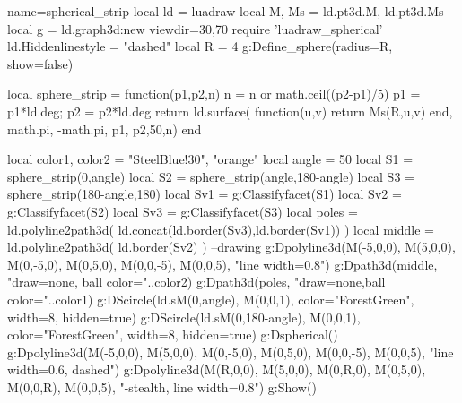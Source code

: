 \documentclass[border=5pt]{standalone}%
\begin{document}
\begin{luadraw}{name=spherical_strip}
local ld = luadraw
local M, Ms = ld.pt3d.M, ld.pt3d.Ms
local g = ld.graph3d:new{ viewdir={30,70} }
require 'luadraw_spherical'
ld.Hiddenlinestyle = "dashed"
local R = 4
g:Define_sphere({radius=R, show=false})

local sphere_strip = function(p1,p2,n)
    n = n or math.ceil((p2-p1)/5)
    p1 = p1*ld.deg; p2 = p2*ld.deg
    return ld.surface( function(u,v) return Ms(R,u,v) end, math.pi, -math.pi, p1, p2,{50,n})
end

local color1, color2 = "SteelBlue!30", "orange"
local angle = 50
local S1 = sphere_strip(0,angle)
local S2 = sphere_strip(angle,180-angle)
local S3 = sphere_strip(180-angle,180)
local Sv1 = g:Classifyfacet(S1)
local Sv2 = g:Classifyfacet(S2)
local Sv3 = g:Classifyfacet(S3)
local poles = ld.polyline2path3d( ld.concat(ld.border(Sv3),ld.border(Sv1)) )
local middle = ld.polyline2path3d( ld.border(Sv2) )
--drawing
g:Dpolyline3d({{M(-5,0,0), M(5,0,0)}, {M(0,-5,0), M(0,5,0)}, {M(0,0,-5), M(0,0,5)}}, 
    "line width=0.8")
g:Dpath3d(middle, "draw=none, ball color="..color2)
g:Dpath3d(poles, "draw=none,ball color="..color1)
g:DScircle({ld.sM(0,angle), M(0,0,1)}, {color="ForestGreen", width=8, hidden=true})
g:DScircle({ld.sM(0,180-angle), M(0,0,1)}, {color="ForestGreen", width=8, hidden=true})
g:Dspherical()
g:Dpolyline3d({{M(-5,0,0), M(5,0,0)}, {M(0,-5,0), M(0,5,0)}, {M(0,0,-5), M(0,0,5)}}, 
    "line width=0.6, dashed")
g:Dpolyline3d({{M(R,0,0), M(5,0,0)}, {M(0,R,0), M(0,5,0)}, {M(0,0,R), M(0,0,5)}}, 
    "-stealth, line width=0.8")
g:Show()
\end{luadraw}
\end{document}
